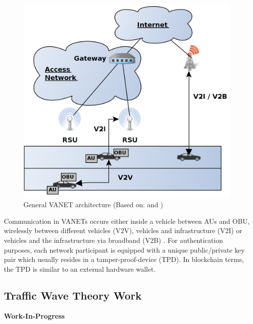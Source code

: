 \documentclass{llncs}
\begin{document}
{\begin{figure}[ht]
				\includegraphics[scale=0.2]{Figures/Vanets.png}
				\caption{General VANET architecture (Based on: \protect\cite{baldessari2007car} and \cite{leiding2016self})}
				\label{fig:vanets}
			\end{figure}			
			Communication in VANETs occurs either inside a vehicle between AUs and OBU, wirelessly between different vehicles (V2V), vehicles and infrastructure (V2I) or vehicles and the infrastructure via broadband (V2B) \cite{faezipour2012progress}. For authentication purposes, each network participant is equipped with a unique public/private key pair which usually resides in a tamper-proof-device (TPD). In blockchain terms, the TPD is similar to an external hardware wallet.
			
		
		\subsection{Traffic Wave Theory Work}
			\label{ss:traffic-wave-theory}

			\textbf{Work-In-Progress}

			

}
\end{document}
